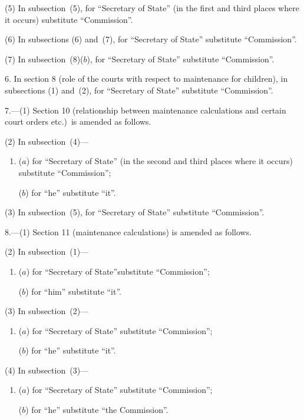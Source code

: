 \documentclass[12pt,a4paper]{article}
\begin{document}
(5) In subsection~(5), for “Secretary of State” (in the first and third places where it occurs) substitute “Commission”.

(6) In subsections (6) and~(7), for “Secretary of State” substitute “Commission”.

(7) In subsection~(8)($b$), for “Secretary of State” substitute “Commission”.

\medskip

6. In section 8 (role of the courts with respect to maintenance for children), in subsections (1) and~(2), for “Secretary of State” substitute “Commission”.

\medskip

7.---(1) Section 10 (relationship between maintenance calculations and certain court orders etc.)\ is amended as follows.

(2) In subsection~(4)—
\begin{enumerate}\item[]
($a$) for “Secretary of State” (in the second and third places where it occurs) substitute “Commission”;

($b$) for “he” substitute “it”.
\end{enumerate}

(3) In subsection~(5), for “Secretary of State” substitute “Commission”.

\medskip

8.---(1) Section 11 (maintenance calculations) is amended as follows.

(2) In subsection~(1)—
\begin{enumerate}\item[]
($a$) for “Secretary of State”substitute “Commission”;

($b$) for “him” substitute “it”.
\end{enumerate}

(3) In subsection~(2)—
\begin{enumerate}\item[]
($a$) for “Secretary of State” substitute “Commission”;

($b$) for “he” substitute “it”.
\end{enumerate}

(4) In subsection~(3)—
\begin{enumerate}\item[]
($a$) for “Secretary of State” substitute “Commission”;

($b$) for “he” substitute “the Commission”.
\end{enumerate}
\end{document}
